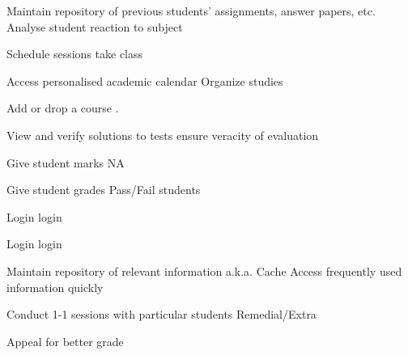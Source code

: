 \documentclass{beamer}
\begin{document}
{Maintain repository of previous students' assignments, answer papers, etc.}
{Analyse student reaction to subject}

{Schedule sessions}
{take class}

{Access personalised academic calendar}
{Organize studies}

{Add or drop a course}
{.}

{View and verify solutions to tests}
{ensure veracity of evaluation}

{Give student marks}
{NA}

{Give student grades}
{Pass/Fail students}

{Login}
{login}

{Login}
{login}

{Maintain repository of relevant information a.k.a. Cache}
{Access frequently used information quickly}

{Conduct 1-1 sessions with particular students}
{Remedial/Extra}

{Appeal for better grade}
{}

							
\end{document}
